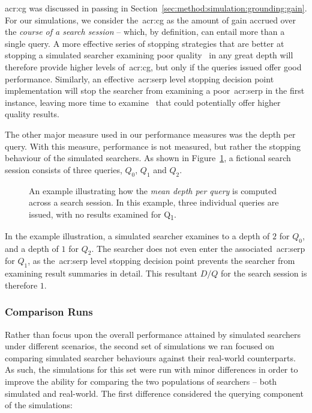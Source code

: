 \gls{acr:cg} was discussed in passing in Section~\ref{sec:method:simulation:grounding:gain}. For our simulations, we consider the~\gls{acr:cg} as the amount of gain accrued over the \emph{course of a search session} -- which, by definition, can entail more than a single query. A more effective series of stopping strategies that are better at stopping a simulated searcher examining poor quality~ in any great depth will therefore provide higher levels of~\gls{acr:cg}, but only if the queries issued offer good performance. Similarly, an effective~\gls{acr:serp} level stopping decision point implementation will stop the searcher from examining a poor~\gls{acr:serp} in the first instance, leaving more time to examine~ that could potentially offer higher quality results.

The other major measure used in our performance measures was the depth per query. With this measure, performance is not measured, but rather the stopping behaviour of the simulated searchers. As shown in Figure~\ref{fig:depth_per_query}, a fictional search session consists of three queries, $Q_0$, $Q_1$ and $Q_2$.

\begin{figure}[h]
    \centering
    \caption[Example depth per query computation]{An example illustrating how the \emph{mean depth per query} is computed across a search session. In this example, three individual queries are issued, with no results examined for Q\textsubscript{1}.}
    \label{fig:depth_per_query}
\end{figure}

In the example illustration, a simulated searcher examines to a depth of $2$ for $Q_0$, and a depth of $1$ for $Q_2$. The searcher does not even enter the associated~\gls{acr:serp} for $Q_1$, as the~\gls{acr:serp} level stopping decision point prevents the searcher from examining result summaries in detail. This resultant $D/Q$ for the search session is therefore $1$.

\vspace*{-4mm}
\subsubsection{Comparison Runs}\label{sec:method:simulation:runs:comparison}
Rather than focus upon the overall performance attained by simulated searchers under different scenarios, the second set of simulations we ran focused on comparing simulated searcher behaviours against their real-world counterparts. As such, the simulations for this set were run with minor differences in order to improve the ability for comparing the two populations of searchers -- both simulated and real-world. The first difference considered the querying component of the simulations:

